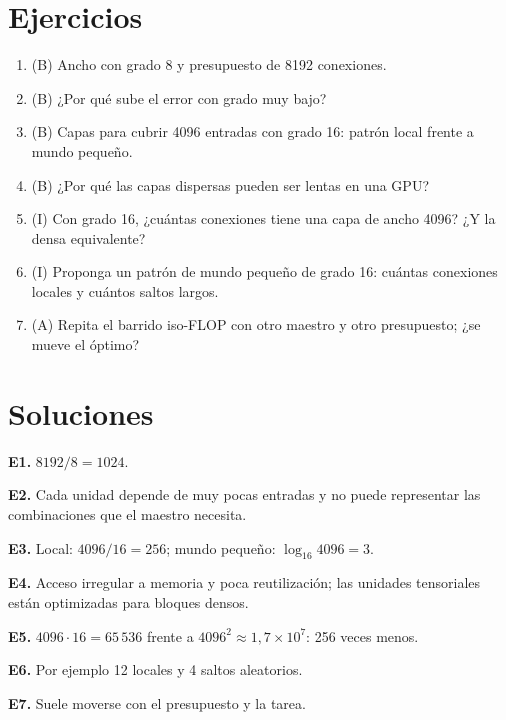 \documentclass[11pt,a4paper]{article}
\begin{document}
\section{Ejercicios}
\begin{enumerate}[label=\textbf{E\arabic*.}]
\item (B) Ancho con grado 8 y presupuesto de 8192 conexiones.
\item (B) ¿Por qué sube el error con grado muy bajo?
\item (B) Capas para cubrir 4096 entradas con grado 16: patrón local frente a mundo pequeño.
\item (B) ¿Por qué las capas dispersas pueden ser lentas en una GPU?
\item (I) Con grado 16, ¿cuántas conexiones tiene una capa de ancho 4096? ¿Y la densa equivalente?
\item (I) Proponga un patrón de mundo pequeño de grado 16: cuántas conexiones locales y cuántos saltos largos.
\item (A) Repita el barrido iso-FLOP con otro maestro y otro presupuesto; ¿se mueve el óptimo?
\end{enumerate}
\section{Soluciones}
\begin{solucion}
\textbf{E1.} $8192/8=1024$.

\textbf{E2.} Cada unidad depende de muy pocas entradas y no puede representar las combinaciones que el maestro necesita.

\textbf{E3.} Local: $4096/16=256$; mundo pequeño: $\log_{16}4096=3$.

\textbf{E4.} Acceso irregular a memoria y poca reutilización; las unidades tensoriales están optimizadas para bloques densos.

\textbf{E5.} $4096\cdot16=65\,536$ frente a $4096^2\approx1{,}7\times10^7$: 256 veces menos.

\textbf{E6.} Por ejemplo 12 locales y 4 saltos aleatorios.

\textbf{E7.} Suele moverse con el presupuesto y la tarea.
\end{solucion}
\end{document}
